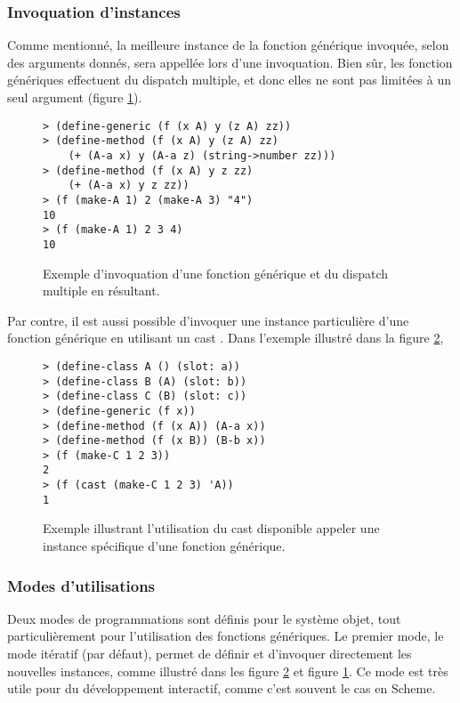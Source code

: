       \subsubsection{Invoquation d'instances}

        Comme mentionné, la meilleure instance de la fonction
        générique invoquée, selon des arguments donnés, sera appellée
        lors d'une invoquation. Bien sûr, les fonction génériques
        effectuent du \og dispatch \fg multiple, et donc elles ne sont
        pas limitées à un seul argument (figure \ref{ex-multdisp}).

        \begin{figure}[h!]
          \begin{lstlisting}
> (define-generic (f (x A) y (z A) zz))
> (define-method (f (x A) y (z A) zz)
    (+ (A-a x) y (A-a z) (string->number zz)))
> (define-method (f (x A) y z zz)
    (+ (A-a x) y z zz))
> (f (make-A 1) 2 (make-A 3) "4")
10
> (f (make-A 1) 2 3 4)
10
          \end{lstlisting}
          \caption{Exemple d'invoquation d'une fonction générique et
            du \og dispatch \fg multiple en résultant.}
          \label{ex-multdisp}
        \end{figure}
        
        Par contre, il est aussi possible d'invoquer une instance
        particulière d'une fonction générique en utilisant un \og cast
        \fg. Dans l'exemple illustré dans la figure \ref{ex-cast},

        \begin{figure}[h!]
          \begin{lstlisting}
> (define-class A () (slot: a))
> (define-class B (A) (slot: b))
> (define-class C (B) (slot: c))
> (define-generic (f x))
> (define-method (f (x A)) (A-a x))
> (define-method (f (x B)) (B-b x))
> (f (make-C 1 2 3))
2
> (f (cast (make-C 1 2 3) 'A))
1
          \end{lstlisting}
          \caption{Exemple illustrant l'utilisation du \og cast \fg
            disponible appeler une instance spécifique d'une fonction
            générique.}
          \label{ex-cast}
        \end{figure}

      \subsubsection{Modes d'utilisations}

        Deux modes de programmations sont définis pour le système
        objet, tout particulièrement pour l'utilisation des fonctions
        génériques. Le premier mode, le mode itératif (par défaut),
        permet de définir et d'invoquer directement les nouvelles
        instances, comme illustré dans les figure \ref{ex-cast} et
        figure \ref{ex-multdisp}. Ce mode est très utile pour du
        développement interactif, comme c'est souvent le cas en
        Scheme. 

